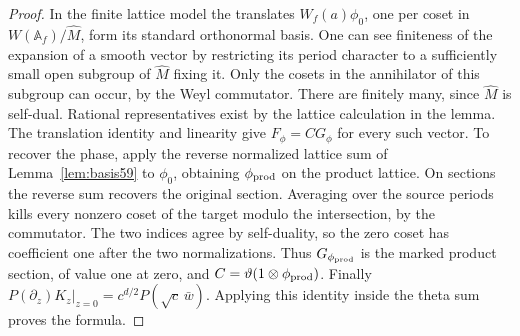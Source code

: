 \documentclass[a4paper,11pt]{article}
\theoremstyle{definition}
\theoremstyle{remark}
\numberwithin{equation}{section}
\begin{document}
\begin{proof}
In the finite lattice model the translates \(W_f(a)\phi_0\), one
per coset in \(W(\mathbb A_f)/\widehat M\), form its standard
orthonormal basis. One can see finiteness of the expansion of a
smooth vector by restricting its period character to a sufficiently
small open subgroup of \(\widehat M\) fixing it. Only the cosets in
the annihilator of this subgroup can occur, by the Weyl commutator.
There are finitely many, since \(\widehat M\) is self-dual. Rational
representatives exist by the lattice calculation in the lemma.
The translation identity and linearity give \(F_\phi=C G_\phi\)
for every such vector. To recover the phase, apply the reverse
normalized lattice sum of Lemma~\ref{lem:basis59} to \(\phi_0\),
obtaining \(\phi_{\rm prod}\) on the product lattice. On sections
the reverse sum recovers the original section. Averaging over the source periods
kills every nonzero coset of the target modulo the intersection,
by the commutator. The two indices agree by self-duality, so the
zero coset has coefficient one after the two normalizations.
Thus \(G_{\phi_{\rm prod}}\) is the marked product section, of
value one at zero, and \(C=\vartheta(1\otimes\phi_{\rm prod})\).
Finally \(P(\partial_z)K_z|_{z=0}
=c^{d/2}P(\sqrt c\,\bar w)\). Applying this identity inside the
theta sum proves the formula.
\end{proof}
\end{document}

